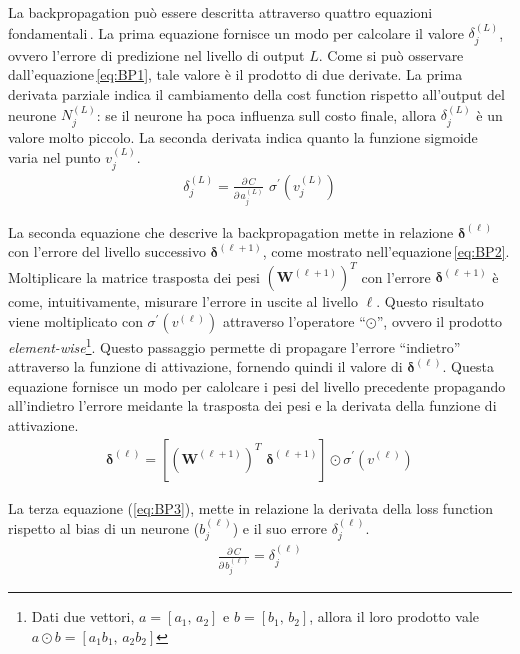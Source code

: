 La backpropagation può essere descritta attraverso quattro equazioni fondamentali\,\cite{nielsen2015neural}. La prima equazione fornisce un modo per calcolare il valore $\delta^{(L)}_j$, ovvero l'errore di predizione nel livello di output $L$. Come si può osservare dall'equazione\,\ref{eq:BP1}, tale valore è il prodotto di due derivate. La prima derivata parziale indica il cambiamento della cost function rispetto all'output del neurone $N^{(L)}_j$: se il neurone ha poca influenza sull costo finale, allora $\delta^{(L)}_j$ è un valore molto piccolo. La seconda derivata indica quanto la funzione sigmoide varia nel punto $v^{(L)}_j$.
% 
\begin{gather}
    \delta^{(L)}_j = \frac{\partial\,C}{\partial\,a^{(L)}_j} \,\, \sigma^\prime \left( v^{(L)}_j \right)
    \label{eq:BP1}
\end{gather}

La seconda equazione che descrive la backpropagation mette in relazione $\boldsymbol{\delta}^{(\ell)}$ con l'errore del livello successivo $\boldsymbol{\delta}^{(\ell + 1)}$, come mostrato nell'equazione\,\ref*{eq:BP2}. Moltiplicare la matrice trasposta dei pesi ${\left( \mathbf{W}^{(\ell + 1)} \right)}^T$ con l'errore $\boldsymbol{\delta}^{(\ell + 1)}$ è come, intuitivamente, misurare l'errore in uscite al livello $\ell$. Questo risultato viene moltiplicato con $\sigma^\prime \left( v^{(\ell)} \right)$ attraverso l'operatore ``$\odot$'', ovvero il prodotto \textit{element-wise}\footnote{Dati due vettori, $a = \left[ a_1,\,a_2\right]$ e $b = \left[ b_1,\,b_2\right]$, allora il loro prodotto vale $ a \odot b = \left[ a_1b_1,\,a_2b_2\right]$}. Questo passaggio permette di propagare l'errore ``indietro'' attraverso la funzione di attivazione, fornendo quindi il valore di $\boldsymbol{\delta}^{(\ell)}$. Questa equazione fornisce un modo per calolcare i pesi del livello precedente propagando all'indietro l'errore meidante la trasposta dei pesi e la derivata della funzione di attivazione.
% 
\begin{gather}
    \boldsymbol{\delta}^{(\ell)} = \left[ {\left( \mathbf{W}^{(\ell + 1)} \right)}^T \,\, \boldsymbol{\delta}^{(\ell + 1)} \right] \odot \sigma^\prime \left( v^{(\ell)} \right)
    \label{eq:BP2}
\end{gather}

La terza equazione (\ref{eq:BP3}), mette in relazione la derivata della loss function rispetto al bias di un neurone ($b^{(\ell)}_j$) e il suo errore $\delta^{(\ell)}_j$.
% 
\begin{gather}
    \frac{\partial\,C}{\partial\,b^{(\ell)}_j} = \delta^{(\ell)}_j
    \label{eq:BP3}
\end{gather}

